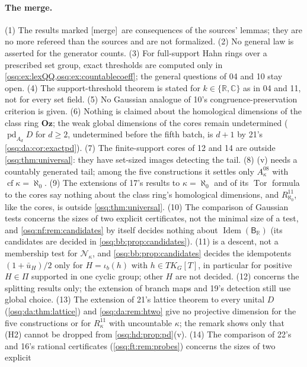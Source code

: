 \documentclass[11pt,letterpaper]{article}
\numberwithin{equation}{section}
\theoremstyle{definition}
\theoremstyle{remark}
\theoremstyle{plain}
\newcommand{\Oz}{\mathbf{Oz}}
\newcommand{\R}{\mathbb R}
\newcommand{\C}{\mathbb C}
\newcommand{\NN}{\mathcal N}         %
\newcommand{\Tor}{\operatorname{Tor}}
\newcommand{\pd}{\operatorname{pd}}
\newcommand{\cf}{\operatorname{cf}}
\newcommand{\Idem}{\operatorname{Idem}}
\newcommand{\merge}{\textup{\textsf{[merge]}}}
\begin{document}
\paragraph{The merge.} (1) The results marked \merge\ are consequences of the sources' lemmas; they
are no more refereed than the sources and are not formalized. (2) No general law is asserted for the
generator counts. (3) For full-support Hahn rings over a prescribed set group, exact thresholds are computed only in
\cref{osq:ex:lexQQ,osq:ex:countablecoeff}; the general questions of 04 and 10 stay open. (4) The
support-threshold theorem is stated for $k\in\{\R,\C\}$ as in 04 and 11, not for every set field.
(5) No Gaussian analogue of 10's congruence-preservation criterion is given. (6) Nothing is claimed about the
homological dimensions of the class ring $\Oz$; the weak global dimensions of the cores remain undetermined ($\pd_{A_d}D$ for
$d\ge2$, undetermined before the fifth batch, is $d+1$ by 21's \cref{osq:da:cor:exactpd}). (7) The finite-support cores of 12 and 14 are outside \cref{osq:thm:universal}: they have set-sized images
detecting the tail. (8) (v) needs a countably generated tail; among the five constructions it settles
only $A^{08}_\kappa$ with $\cf\kappa=\aleph_0$. (9) The extensions of 17's results to $\kappa=\aleph_0$ and of its $\Tor$ formula to the cores
say nothing about the class ring's homological dimensions, and $R^{11}_{\aleph_0}$, like the cores, is outside \cref{osq:thm:universal}.
(10) The comparison of Gaussian tests concerns the sizes of two explicit certificates, not the minimal size of a test, and
\cref{osq:nf:rem:candidates} by itself decides nothing about $\Idem(\mathsf B_\R)$ (its candidates are decided in \cref{osq:bb:prop:candidates}).
(11)  is a descent, not a membership test for $\NN_\kappa$, and \cref{osq:bb:prop:candidates} decides the idempotents
$(1+\bar u_H)/2$ only for $H=\iota_b(h)$ with $h\in TK_G[T]$, in particular for positive $H\in\Pi$ supported in one cyclic group; other $H$ are
not decided. (12)  concerns the splitting results only; the extension of branch maps and 19's detection still use global
choice. (13) The extension of 21's lattice theorem to every unital $D$ (\cref{osq:da:thm:lattice}) and \cref{osq:da:rem:htwo} give no projective
dimension for the five constructions or for $R^{11}_\kappa$ with uncountable $\kappa$; the remark shows only that (H2) cannot be dropped from
\cref{osq:hd:prop:pd}(v). (14) The comparison of 22's and 16's rational certificates (\cref{osq:ft:rem:probes}) concerns the sizes of two explicit
\end{document}
